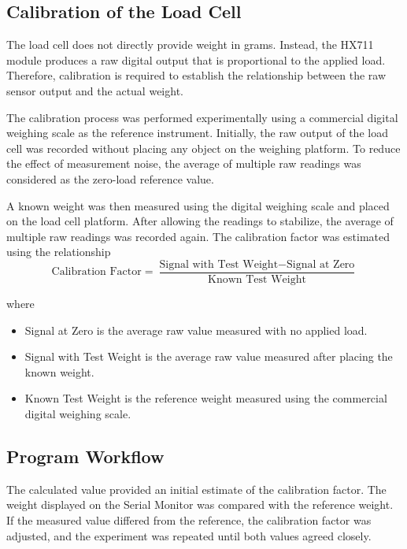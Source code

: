 \subsection{Calibration of the Load Cell}

The load cell does not directly provide weight in grams. Instead, the HX711 module produces a raw digital output that is proportional to the applied load. Therefore, calibration is required to establish the relationship between the raw sensor output and the actual weight.

The calibration process was performed experimentally using a commercial digital weighing scale as the reference instrument. Initially, the raw output of the load cell was recorded without placing any object on the weighing platform. To reduce the effect of measurement noise, the average of multiple raw readings was considered as the zero-load reference value.

A known weight was then measured using the digital weighing scale and placed on the load cell platform. After allowing the readings to stabilize, the average of multiple raw readings was recorded again.
The calibration factor was estimated using the relationship
\begin{equation}
\text{Calibration Factor}=
\frac{\text{Signal with Test Weight}-\text{Signal at Zero}}
{\text{Known Test Weight}}
\label{eq:calibration}
\end{equation}

where

\begin{itemize}
\item Signal at Zero is the average raw value measured with no applied load.
\item Signal with Test Weight is the average raw value measured after placing the known weight.
\item Known Test Weight is the reference weight measured using the commercial digital weighing scale.
\end{itemize}

\thispagestyle{githubpage}

\thispagestyle{githubpage}

\subsection{Program Workflow}

The calculated value provided an initial estimate of the calibration factor.
The weight displayed on the Serial Monitor was compared with the reference weight. If the measured value differed from the reference, the calibration factor was adjusted, and the experiment was repeated until both values agreed closely.

